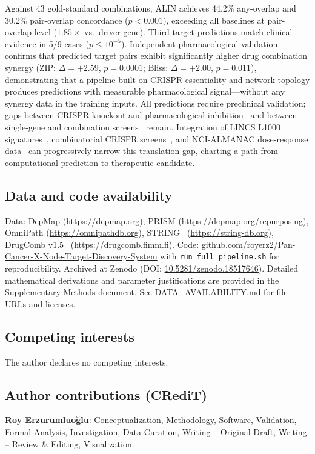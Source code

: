 \documentclass[11pt]{article}
\begin{document}
Against 43 gold-standard combinations, ALIN achieves 44.2\% any-overlap and 30.2\% pair-overlap concordance ($p < 0.001$), exceeding all baselines at pair-overlap level ($1.85\times$ vs.\ driver-gene). Third-target predictions match clinical evidence in 5/9 cases ($p \leq 10^{-5}$). Independent pharmacological validation confirms that predicted target pairs exhibit significantly higher drug combination synergy (ZIP: $\Delta = +2.59$, $p = 0.0001$; Bliss: $\Delta = +2.00$, $p = 0.011$), demonstrating that a pipeline built on CRISPR essentiality and network topology produces predictions with measurable pharmacological signal---without any synergy data in the training inputs. All predictions require preclinical validation; gaps between CRISPR knockout and pharmacological inhibition~\cite{Lin2017,Goncalves2020} and between single-gene and combination screens~\cite{Norman2019} remain. Integration of LINCS L1000 signatures~\cite{Subramanian2017}, combinatorial CRISPR screens~\cite{Norman2019}, and NCI-ALMANAC dose-response data~\cite{Holbeck2017} can progressively narrow this translation gap, charting a path from computational prediction to therapeutic candidate.

\subsection*{Data and code availability}
Data: DepMap (\url{https://depmap.org}), PRISM (\url{https://depmap.org/repurposing}), OmniPath (\url{https://omnipathdb.org}), STRING~\cite{Szklarczyk2025} (\url{https://string-db.org}), DrugComb v1.5~\cite{Zagidullin2019,Zheng2022} (\url{https://drugcomb.fimm.fi}).
Code: \href{https://github.com/royerz2/Pan-Cancer-X-Node-Target-Discovery-System}{github.com/royerz2/Pan-Cancer-X-Node-Target-Discovery-System} with \texttt{run\_full\_pipeline.sh} for reproducibility.
Archived at Zenodo (DOI: \href{https://doi.org/10.5281/zenodo.18517646}{10.5281/zenodo.18517646}).
Detailed mathematical derivations and parameter justifications are provided in the Supplementary Methods document. See DATA\_AVAILABILITY.md for file URLs and licenses.

\subsection*{Competing interests}
The author declares no competing interests.

\subsection*{Author contributions (CRediT)}
\textbf{Roy Erzurumluoğlu}: Conceptualization, Methodology, Software, Validation, Formal Analysis, Investigation, Data Curation, Writing -- Original Draft, Writing -- Review \& Editing, Visualization.
\end{document}
